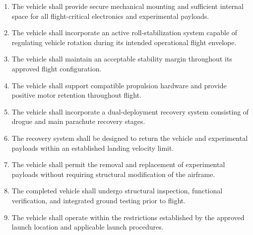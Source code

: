 \begin{enumerate}

    \item The vehicle shall provide secure
    mechanical mounting and sufficient
    internal space for all flight-critical
    electronics and experimental payloads.

    \item The vehicle shall incorporate
    an active roll-stabilization system
    capable of regulating vehicle
    rotation during its intended
    operational flight envelope.

    \item The vehicle shall maintain
    an acceptable stability margin
    throughout its approved
    flight configuration.

    \item The vehicle shall support
    compatible propulsion hardware
    and provide positive motor
    retention throughout flight.

    \item The vehicle shall incorporate
    a dual-deployment recovery system
    consisting of drogue and
    main parachute recovery stages.

    \item The recovery system shall
    be designed to return the vehicle
    and experimental payloads
    within an established
    landing velocity limit.

    \item The vehicle shall permit
    the removal and replacement
    of experimental payloads
    without requiring structural
    modification of the airframe.

    \item The completed vehicle shall
    undergo structural inspection,
    functional verification,
    and integrated ground testing
    prior to flight.

    \item The vehicle shall operate
    within the restrictions
    established by the approved
    launch location and
    applicable launch procedures.

\end{enumerate}
